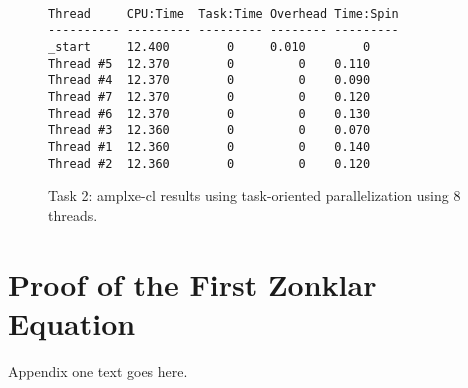 \documentclass[journal]{IEEEtran}
\begin{document}
\begin{figure}[here]
  \begin{lstlisting}[style=c++]

Thread     CPU:Time  Task:Time Overhead Time:Spin
---------- --------- --------- -------- ---------
_start     12.400        0     0.010        0
Thread #5  12.370        0         0    0.110
Thread #4  12.370        0         0    0.090
Thread #7  12.370        0         0    0.120
Thread #6  12.370        0         0    0.130
Thread #3  12.360        0         0    0.070
Thread #1  12.360        0         0    0.140
Thread #2  12.360        0         0    0.120

  \end{lstlisting}
  \caption{Task 2: amplxe-cl results using task-oriented parallelization using 8 threads.}
  \label{fig:result21}
\end{figure}






%


\appendices
\section{Proof of the First Zonklar Equation}
Appendix one text goes here.
\end{document}
